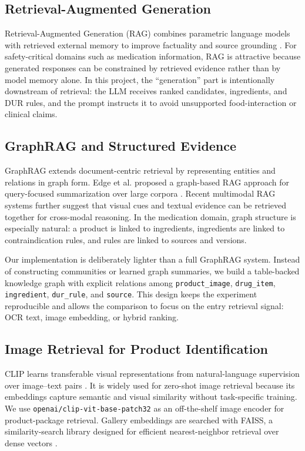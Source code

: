 \documentclass[sigconf,screen,nonacm]{acmart}
\begin{document}
\subsection{Retrieval-Augmented Generation}
Retrieval-Augmented Generation (RAG) combines parametric language models with retrieved external memory to improve factuality and source grounding \cite{lewis2020rag}. For safety-critical domains such as medication information, RAG is attractive because generated responses can be constrained by retrieved evidence rather than by model memory alone. In this project, the ``generation'' part is intentionally downstream of retrieval: the LLM receives ranked candidates, ingredients, and DUR rules, and the prompt instructs it to avoid unsupported food-interaction or clinical claims.

\subsection{GraphRAG and Structured Evidence}
GraphRAG extends document-centric retrieval by representing entities and relations in graph form. Edge et al. proposed a graph-based RAG approach for query-focused summarization over large corpora \cite{edge2024graphrag}. Recent multimodal RAG systems further suggest that visual cues and textual evidence can be retrieved together for cross-modal reasoning. In the medication domain, graph structure is especially natural: a product is linked to ingredients, ingredients are linked to contraindication rules, and rules are linked to sources and versions.

Our implementation is deliberately lighter than a full GraphRAG system. Instead of constructing communities or learned graph summaries, we build a table-backed knowledge graph with explicit relations among \texttt{product\_image}, \texttt{drug\_item}, \texttt{ingredient}, \texttt{dur\_rule}, and \texttt{source}. This design keeps the experiment reproducible and allows the comparison to focus on the entry retrieval signal: OCR text, image embedding, or hybrid ranking.

\subsection{Image Retrieval for Product Identification}
CLIP learns transferable visual representations from natural-language supervision over image--text pairs \cite{radford2021clip}. It is widely used for zero-shot image retrieval because its embeddings capture semantic and visual similarity without task-specific training. We use \texttt{openai/clip-vit-base-patch32} as an off-the-shelf image encoder for product-package retrieval. Gallery embeddings are searched with FAISS, a similarity-search library designed for efficient nearest-neighbor retrieval over dense vectors \cite{johnson2017billion}.
\end{document}
